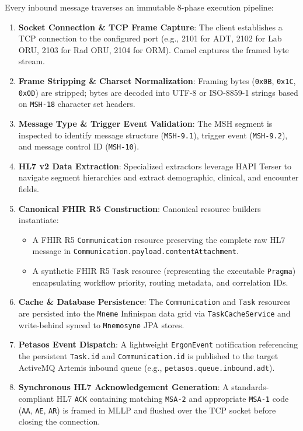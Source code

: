 Every inbound message traverses an immutable 8-phase execution pipeline:
\begin{enumerate}
    \item \textbf{Socket Connection \& TCP Frame Capture}: The client establishes a TCP connection to the configured port (e.g., 2101 for ADT, 2102 for Lab ORU, 2103 for Rad ORU, 2104 for ORM). Camel captures the framed byte stream.
    \item \textbf{Frame Stripping \& Charset Normalization}: Framing bytes (\texttt{0x0B}, \texttt{0x1C}, \texttt{0x0D}) are stripped; bytes are decoded into UTF-8 or ISO-8859-1 strings based on \texttt{MSH-18} character set headers.
    \item \textbf{Message Type \& Trigger Event Validation}: The MSH segment is inspected to identify message structure (\texttt{MSH-9.1}), trigger event (\texttt{MSH-9.2}), and message control ID (\texttt{MSH-10}).
    \item \textbf{HL7 v2 Data Extraction}: Specialized extractors leverage HAPI Terser to navigate segment hierarchies and extract demographic, clinical, and encounter fields.
    \item \textbf{Canonical FHIR R5 Construction}: Canonical resource builders instantiate:
    \begin{itemize}
        \item A FHIR R5 \texttt{Communication} resource preserving the complete raw HL7 message in \texttt{Communication.payload.contentAttachment}.
        \item A synthetic FHIR R5 \texttt{Task} resource (representing the executable \texttt{Pragma}) encapsulating workflow priority, routing metadata, and correlation IDs.
    \end{itemize}
    \item \textbf{Cache \& Database Persistence}: The \texttt{Communication} and \texttt{Task} resources are persisted into the \texttt{Mneme} Infinispan data grid via \texttt{TaskCacheService} and write-behind synced to \texttt{Mnemosyne} JPA stores.
    \item \textbf{Petasos Event Dispatch}: A lightweight \texttt{ErgonEvent} notification referencing the persistent \texttt{Task.id} and \texttt{Communication.id} is published to the target ActiveMQ Artemis inbound queue (e.g., \texttt{petasos.queue.inbound.adt}).
    \item \textbf{Synchronous HL7 Acknowledgement Generation}: A standards-compliant HL7 \texttt{ACK} containing matching \texttt{MSA-2} and appropriate \texttt{MSA-1} code (\texttt{AA}, \texttt{AE}, \texttt{AR}) is framed in MLLP and flushed over the TCP socket before closing the connection.
\end{enumerate}

